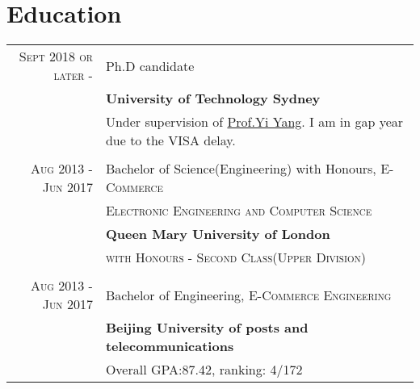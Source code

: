 \documentclass[a4paper,10pt]{article}
\begin{document}
\section{Education}
\begin{tabular}{rl}	

 \textsc{Sept 2018 or later} - \textsc{} & Ph.D candidate\\
& \textbf{University of Technology Sydney}\\
& Under supervision of \href{https://sites.google.com/site/ianyyang2016/}{Prof.Yi Yang}. I am in gap year due to the VISA delay.\\
\\
 \textsc{Aug 2013} - \textsc{Jun 2017} & Bachelor of Science(Engineering) with Honours, \textsc{E-Commerce}\\
&\textsc{Electronic Engineering and} \textsc{Computer Science}\\
& \textbf{Queen Mary University of London}\\
& \textsc{with Honours - Second Class(Upper Division)}  \\
\\

 \textsc{Aug 2013} - \textsc{Jun 2017} & Bachelor of Engineering, \textsc{E-Commerce Engineering}\\
& \textbf{Beijing University of posts and telecommunications}\\
& Overall GPA:\textsc{87.42}, ranking: \textsc{4/172}  \\

\end{tabular}

\end{document}
